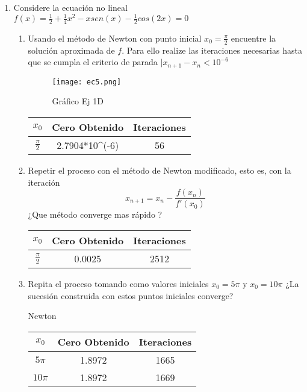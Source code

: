 \documentclass{udpreport}
\begin{document}
\begin{enumerate}
\begin{enumerate}
    \newpage
    
    
    \end{enumerate}
\newpage
\item Considere la ecuación no lineal $f(x)= \frac{1}{2}+\frac{1}{4}x^2-xsen(x)-\frac{1}{2}cos(2x)=0$
    	\begin{enumerate}
    	\item  Usando el método de Newton con punto inicial $x_{0}=\frac{\pi}{2}$ encuentre la solución aproximada de $f$. Para ello realize las iteraciones necesarias hasta que se cumpla el criterio de parada $ |x_{n+1} - x_{n} < 10^{-6} $
    	\begin{figure}[H]
        \centering
        \texttt{[image: ec5.png]}
        \caption{Gráfico Ej 1D}
        \end{figure}
        	\begin{table} [H]
        			\centering
        			\begin{tabular}{|c|c|c|}
        				\hline
        				$x_{0}$ & Cero Obtenido & Iteraciones\\
        				\hline
        				$\frac{\pi}{2} $ &  2.7904*10^(-6) & 56\\
        				\hline 
        			\end{tabular}
        		\end{table}
        	
        	\item Repetir el proceso con el método de Newton modificado, esto es, con la iteración $$x_{n+1} = x_{n} - \frac {f(x_{n})} {f'(x_{0})} $$
        	¿Que método converge mas rápido ?
        \begin{table} [H]
        			\centering
        			\begin{tabular}{|c|c|c|}
        				\hline
        				$x_{0}$ & Cero Obtenido & Iteraciones\\
        				\hline
        				$\frac{\pi}{2} $ &  0.0025 & 2512\\
        				\hline 
        			\end{tabular}
        		\end{table}
        \item Repita el proceso tomando como valores iniciales $x_{0}=5\pi$ y $x_{0}=10\pi$ ¿La sucesión construida con estos puntos iniciales converge?
        	 	\begin{table} [H]Newton 
        			\centering
        			\begin{tabular}{|c|c|c|}
        				\hline
        				$x_{0}$ & Cero Obtenido & Iteraciones\\
        				\hline
        				$5\pi$ & 1.8972 & 1665 \\
        				\hline 
        				$10\pi$ & 1.8972 & 1669\\
        				\hline
        			\end{tabular}
        		\end{table}
        		

\end{enumerate}
\end{enumerate}
\end{document}
